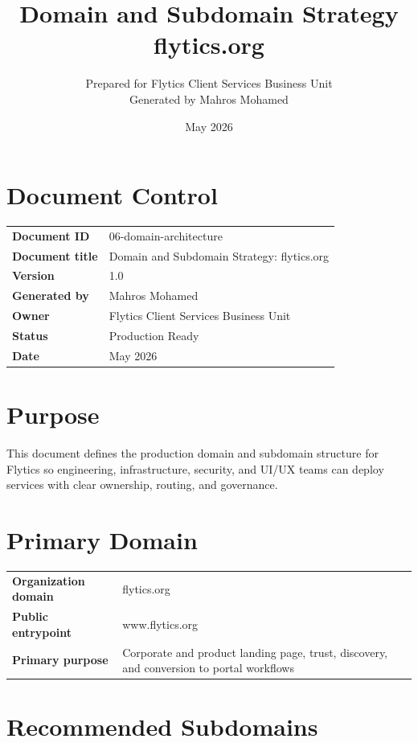 \documentclass[11pt,a4paper]{article}
\title{\textbf{Domain and Subdomain Strategy\\flytics.org}}
\author{Prepared for Flytics Client Services Business Unit\\Generated by Mahros Mohamed}
\date{May 2026}
\begin{document}
\maketitle
\section*{Document Control}
\begin{longtable}{>{\bfseries}p{}p{}}
\toprule
Document ID & 06-domain-architecture \\
Document title & Domain and Subdomain Strategy: flytics.org \\
Version & 1.0 \\
Generated by & Mahros Mohamed \\
Owner & Flytics Client Services Business Unit \\
Status & Production Ready \\
Date & May 2026 \\
\bottomrule
\end{longtable}

\renewcommand{\contentsname}{Contents}
\tableofcontents
\newpage

\section*{Purpose}

This document defines the production domain and subdomain structure for Flytics so engineering, infrastructure, security, and UI/UX teams can deploy services with clear ownership, routing, and governance.

\section{Primary Domain}

\begin{longtable}{>{\bfseries}p{}p{}}
\toprule
Organization domain & flytics.org \\
Public entrypoint & www.flytics.org \\
Primary purpose & Corporate and product landing page, trust, discovery, and conversion to portal workflows \\
\bottomrule
\end{longtable}

\section{Recommended Subdomains}
\end{document}
